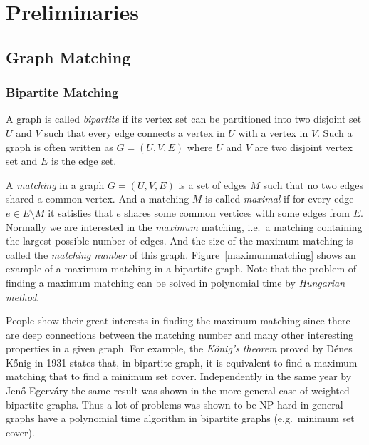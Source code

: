 \chapter{Preliminaries}

\section{Graph Matching}

\subsection{Bipartite Matching}

A graph is called \emph{bipartite} if its vertex set can be 
partitioned into two disjoint set $U$ and $V$ such that every edge
connects a vertex in $U$ with a vertex in $V$. Such a graph is often 
written as $G = (U, V, E)$ where $U$ and $V$ are two disjoint vertex set
and $E$ is the edge set.

A \emph{matching} in a graph $G = (U, V, E)$ is a set of edges $M$ such
that no two edges shared a common vertex. And a matching $M$ is called 
\emph{maximal} if for every edge $e \in E \setminus M$ it satisfies that
$e$ shares some common vertices with some edges from $E$.
Normally we are interested in the \emph{maximum} matching, i.e.\ a matching
containing the largest possible number of edges. And the size of the
maximum matching is called the \emph{matching number} of this graph.
Figure~\ref{maximummatching} shows an example of a maximum matching in
a bipartite graph. Note that the problem of finding a maximum matching 
can be solved in polynomial time by \emph{Hungarian method}.

People show their great interests in finding the maximum matching since
there are deep connections between the matching number and many other
interesting properties in a given graph. 
For example, the \emph{K\"{o}nig's theorem} proved by D\'{e}nes K\H{o}nig
in 1931 states that, in bipartite graph, it is equivalent to find 
a maximum matching that to find a minimum set cover. Independently in
the same year by Jen\H{o} Egerv\'{a}ry the same result was shown in the
more general case of weighted bipartite graphs. Thus a lot of problems
was shown to be NP-hard in general graphs have a polynomial time
algorithm in bipartite graphs (e.g.\ minimum set cover).

